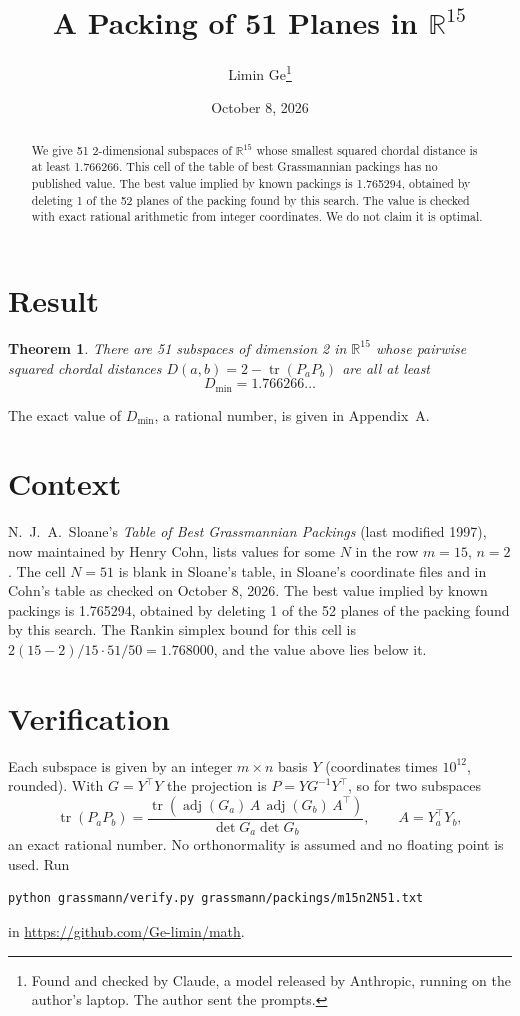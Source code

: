 \documentclass[11pt,a4paper]{article}
\title{A Packing of 51 Planes in $\mathbb{R}^{15}$}
\author{Limin Ge\thanks{Found and checked by Claude, a model released by Anthropic, running on the author's laptop. The author sent the prompts.}}
\date{October 8, 2026}
\newtheorem*{theorem}{Theorem}
\begin{document}
\maketitle
\begin{abstract}
We give 51 2-dimensional subspaces of $\mathbb{R}^{15}$ whose smallest squared chordal distance is at least 1.766266. This cell of the table of best Grassmannian packings has no published value. The best value implied by known packings is 1.765294, obtained by deleting 1 of the 52 planes of the packing found by this search. The value is checked with exact rational arithmetic from integer coordinates. We do not claim it is optimal.
\end{abstract}

\section{Result}
\begin{theorem}
There are 51 subspaces of dimension 2 in $\mathbb{R}^{15}$ whose pairwise squared chordal distances $D(a,b) = 2 - \operatorname{tr}(P_aP_b)$ are all at least
\[ D_{\min} = 1.766266\ldots \]
\end{theorem}
The exact value of $D_{\min}$, a rational number, is given in Appendix~A.


\section{Context}
N.~J.~A.~Sloane's \emph{Table of Best Grassmannian Packings} (last modified 1997), now maintained by Henry Cohn, lists values for some $N$ in the row $m=15$, $n=2$. The cell $N=51$ is blank in Sloane's table, in Sloane's coordinate files and in Cohn's table as checked on October 8, 2026. The best value implied by known packings is 1.765294, obtained by deleting 1 of the 52 planes of the packing found by this search. The Rankin simplex bound for this cell is $2(15-2)/15\cdot 51/50 = 1.768000$, and the value above lies below it.


\section{Verification}
Each subspace is given by an integer $m\times n$ basis $Y$ (coordinates times $10^{12}$, rounded). With $G=Y^\top Y$ the projection is $P=YG^{-1}Y^\top$, so for two subspaces
\[ \operatorname{tr}(P_aP_b)=\frac{\operatorname{tr}(\operatorname{adj}(G_a)\,A\,\operatorname{adj}(G_b)\,A^\top)}{\det G_a\det G_b},\qquad A=Y_a^\top Y_b, \]
an exact rational number. No orthonormality is assumed and no floating point is used. Run
\begin{verbatim}
python grassmann/verify.py grassmann/packings/m15n2N51.txt
\end{verbatim}
in \url{https://github.com/Ge-limin/math}.
\end{document}
